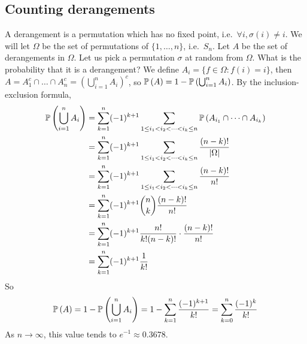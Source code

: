 \subsection{Counting derangements}
A derangement is a permutation which has no fixed point, i.e.\ \(\forall i, \sigma(i) \neq i\).
We will let \(\Omega\) be the set of permutations of \(\{1, \dots, n\}\), i.e.\ \(S_n\).
Let \(A\) be the set of derangements in \(\Omega\).
Let us pick a permutation \(\sigma\) at random from \(\Omega\).
What is the probability that it is a derangement?
We define \(A_i = \{ f \in \Omega \colon f(i) = i \}\), then \(A = A_1^c \cap \dots \cap A_n^c = \left( \bigcup_{i=1}^n A_i  \right)^c\), so \(\mathbb{P}\left({A}\right) = 1 - \mathbb{P}\left({\bigcup_{i=1}^n A_i}\right)\).
By the inclusion-exclusion formula,
\begin{align*}
	\mathbb{P}\left({\bigcup_{i=1}^n A_i}\right) & = \sum_{k=1}^n (-1)^{k+1} \sum_{1 \leq i_1 < i_2 < \dots < i_k \leq n} \mathbb{P}\left({A_{i_1} \cap \dots \cap A_{i_k}}\right) \\
	                           & = \sum_{k=1}^n (-1)^{k+1} \sum_{1 \leq i_1 < i_2 < \dots < i_k \leq n} \frac{(n-k)!}{\abs{\Omega}}            \\
	                           & = \sum_{k=1}^n (-1)^{k+1} \sum_{1 \leq i_1 < i_2 < \dots < i_k \leq n} \frac{(n-k)!}{n!}                      \\
	                           & = \sum_{k=1}^n (-1)^{k+1} \binom{n}{k} \frac{(n-k)!}{n!}                                                      \\
	                           & = \sum_{k=1}^n (-1)^{k+1} \frac{n!}{k!(n-k)!} \cdot \frac{(n-k)!}{n!}                                         \\
	                           & = \sum_{k=1}^n (-1)^{k+1} \frac{1}{k!}                                                                        \\
\end{align*}
So
\[
	\mathbb{P}\left({A}\right) = 1 - \mathbb{P}\left({\bigcup_{i=1}^n A_i}\right) = 1 - \sum_{k=1}^n \frac{(-1)^{k+1}}{k!} = \sum_{k=0}^n \frac{(-1)^k}{k!}
\]
As \(n \to \infty\), this value tends to \(e^{-1} \approx 0.3678\).
